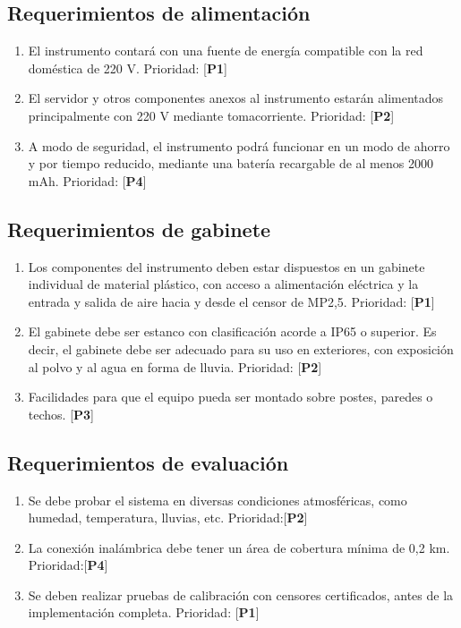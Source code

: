 \subsection{Requerimientos de alimentación}
\begin{enumerate}[label=\alph*)]
	\item El instrumento contará con una fuente de energía compatible con la red doméstica de 220 V. Prioridad: [\textbf{P1}]
	\item El servidor y otros componentes anexos al instrumento estarán alimentados principalmente con 220 V mediante tomacorriente. Prioridad: [\textbf{P2}]
	\item A modo de seguridad, el instrumento podrá funcionar en un modo de ahorro y por tiempo reducido, mediante una batería recargable de al menos 2000 mAh. Prioridad: [\textbf{P4}]
\end{enumerate}
\subsection{Requerimientos de gabinete}
\begin{enumerate}[label=\alph*)]
	\item Los componentes del instrumento deben estar dispuestos en un gabinete individual de material plástico, con acceso a alimentación eléctrica y la entrada y salida de aire hacia y desde el censor de MP2,5. Prioridad: [\textbf{P1}]
	\item El gabinete debe ser estanco con clasificación acorde a IP65 o superior. Es decir, el gabinete debe ser adecuado para su uso en exteriores, con exposición al polvo y al agua en forma de lluvia. Prioridad: [\textbf{P2}]
	\item Facilidades para que el equipo pueda ser montado sobre postes, paredes o techos. [\textbf{P3}]
\end{enumerate}
\subsection{Requerimientos de evaluación}
\begin{enumerate}[label=\alph*)]
	\item Se debe probar el sistema en diversas condiciones atmosféricas, como humedad, temperatura, lluvias, etc. Prioridad:[\textbf{P2}]
	\item La conexión inalámbrica debe tener un área de cobertura mínima de 0,2 km. Prioridad:[\textbf{P4}]
	\item Se deben realizar pruebas de calibración con censores certificados, antes de la implementación completa. Prioridad: [\textbf{P1}]
\end{enumerate}

